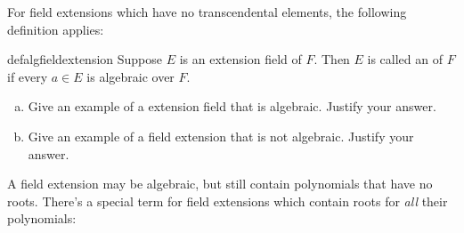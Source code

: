 
For field extensions which have no transcendental elements, the following definition applies:

\begin{defn}{defalgfieldextension}  
Suppose $E$ is an extension field of $F$. Then $E$ is called an  of $F$ if every $a\in E$ is algebraic over $F$. %
 \end{defn}

\begin{exercise}{}
\begin{enumerate}[(a)]
\item
Give an example of a extension field that is algebraic. Justify your answer.
\item
Give an example of a field extension that is not algebraic. Justify your answer.
\end{enumerate}
\end{exercise}

A field extension may be algebraic, but still contain polynomials that have no roots. There's a special term for field extensions which contain roots for \emph{all} their polynomials:


